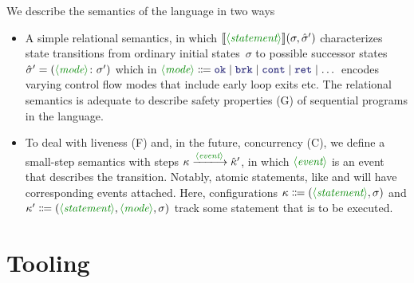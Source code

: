 \documentclass[runningheads]{llncs}
\begin{document}
We describe the semantics of the language in two ways
\begin{itemize}
\item A simple relational semantics, in which $\sem{\nonterminal{statement}}(\sigma,\hat\sigma')$ characterizes state transitions from ordinary initial states~$\sigma$
to possible successor states~$\hat\sigma' = (\nonterminal{mode} \colon \sigma')$ which in 
$\nonterminal{mode} \Coloneqq \terminal{ok} \mid \terminal{brk} \mid \terminal{cont} \mid \terminal{ret} \mid \dots$
encodes varying control flow modes that include early loop exits etc.
The relational semantics is adequate to describe safety properties (G)
of sequential programs in the language.
\item To deal with liveness (F) and, in the future, concurrency (C),
we define a small-step semantics with steps $\kappa \xlongrightarrow{\nonterminal{event}} \hat\kappa'$,
in which $\nonterminal{event}$ is an event that describes the transition.
Notably, atomic statements, like  and 
will have corresponding events attached.
Here, configurations $\kappa \Coloneqq (\nonterminal{statement},\sigma)$
and $\kappa' \Coloneqq (\nonterminal{statement},\nonterminal{mode},\sigma)$
track some statement that is to be executed.
\end{itemize}

\section{Tooling}
\end{document}
